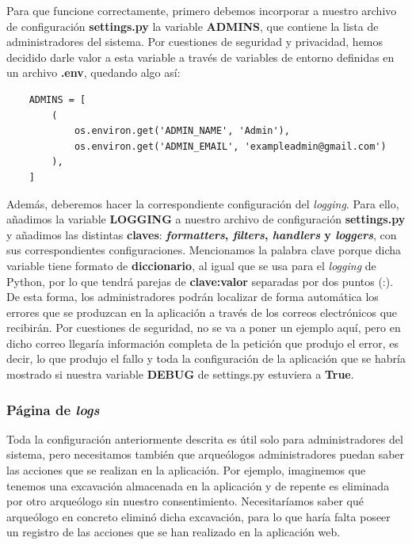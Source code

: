 Para que funcione correctamente, primero debemos incorporar a nuestro archivo de
configuración \textbf{settings.py} la variable \textbf{ADMINS}, que contiene la lista de
administradores del sistema. Por cuestiones de seguridad y privacidad, hemos decidido
darle valor a esta variable a través de variables de entorno definidas en un archivo
\textbf{.env}, quedando algo así:

    
    \begin{verbatim}
    ADMINS = [
        (
            os.environ.get('ADMIN_NAME', 'Admin'),
            os.environ.get('ADMIN_EMAIL', 'exampleadmin@gmail.com')
        ),
    ]
    \end{verbatim}

Además, deberemos hacer la correspondiente configuración del \textit{logging}. Para ello,
añadimos la variable \textbf{LOGGING} a nuestro archivo de configuración \textbf{settings.py}
y añadimos las distintas \textbf{claves}: \textbf{\textit{formatters}, \textit{filters},
\textit{handlers} y \textit{loggers}}, con sus correspondientes configuraciones. Mencionamos
la palabra clave porque dicha variable tiene formato de \textbf{diccionario}, al igual que
se usa para el \textit{logging} de Python, por lo que tendrá parejas de \textbf{clave:valor}
separadas por dos puntos (:). \\

De esta forma, los administradores podrán localizar de forma automática los errores
que se produzcan en la aplicación a través de los correos electrónicos que recibirán. Por
cuestiones de seguridad, no se va a poner un ejemplo aquí, pero en dicho correo llegaría
información completa de la petición que produjo el error, es decir, lo que produjo el
fallo y toda la configuración de la aplicación que se habría mostrado si nuestra variable
\textbf{DEBUG} de settings.py estuviera a \textbf{True}.


\subsubsection{Página de \textit{logs}}
Toda la configuración anteriormente descrita es útil solo para administradores del sistema,
pero necesitamos también que arqueólogos administradores puedan saber las acciones que se
realizan en la aplicación. Por ejemplo, imaginemos que tenemos una excavación almacenada en
la aplicación y de repente es eliminada por otro arqueólogo sin nuestro consentimiento.
Necesitaríamos saber qué arqueólogo en concreto eliminó dicha excavación, para lo que haría
falta poseer un registro de las acciones que se han realizado en la aplicación web. \\

